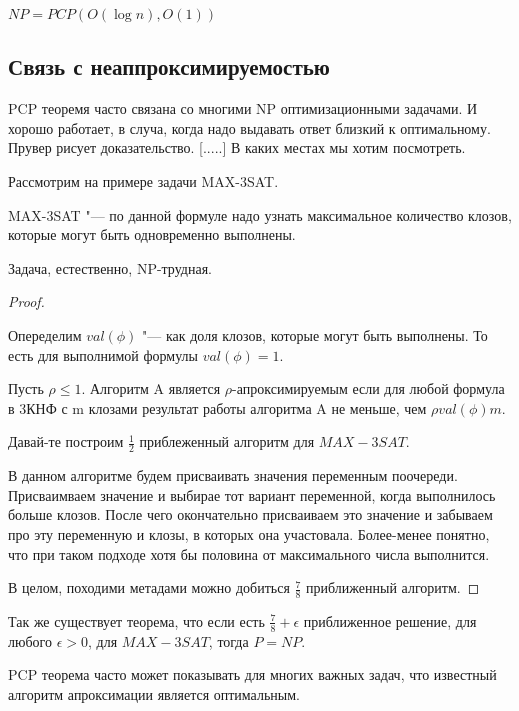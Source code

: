 \begin{theorem}
	$NP = PCP(O(\log n), O(1))$ 
\end{theorem} 

\subsection{Связь с неаппроксимируемостью}
PCP теоремя часто связана со многими NP оптимизационными задачами. 
И хорошо работает, в случа, когда надо выдавать ответ близкий к оптимальному. 
Прувер рисует доказательство. [.....] 
В каких местах мы хотим посмотреть. 

Рассмотрим на примере задачи MAX-3SAT. 
\begin{Def}
	MAX-3SAT "--- по данной формуле надо узнать максимальное 
	количество клозов, которые могут быть одновременно выполнены.
\end{Def}

Задача, естественно, NP-трудная.
\begin{proof}
	\begin{Def}
		Опеределим $val(\phi)$ "--- как доля клозов, которые 
		могут быть выполнены. То есть для выполнимой формулы $val(\phi) = 1$.
	\end{Def}
	\begin{Def}
	        Пусть $\rho \le 1$. Алгоритм A является $\rho$-апроксимируемым 
	        если для любой формула в 3КНФ с m клозами результат работы алгоритма A
	        не меньше, чем $\rho val(\phi)m$.
	\end{Def}

	Давай-те построим $\frac{1}{2}$ приблеженный алгоритм для $MAX-3SAT$.

	В данном алгоритме будем присваивать значения переменным поочереди. 
	Присваимваем значение и выбирае тот вариант переменной, когда выполнилось 
	больше клозов. После чего окончательно присваиваем это значение и забываем про 
	эту переменную и клозы, в которых она участовала. Более-менее понятно, 
	что при таком подходе хотя бы половина от максимального числа выполнится. 

	В целом, походими метадами можно добиться $\frac{7}{8}$ приближенный 
	алгоритм. 
\end{proof} 

Так же существует теорема, что если есть $\frac{7}{8} + \epsilon$ приближенное
решение, для любого $\epsilon > 0$, для $MAX-3SAT$, тогда $P = NP$.

PCP теорема часто может показывать для многих важных задач, что известный
алгоритм апроксимации является оптимальным.   



